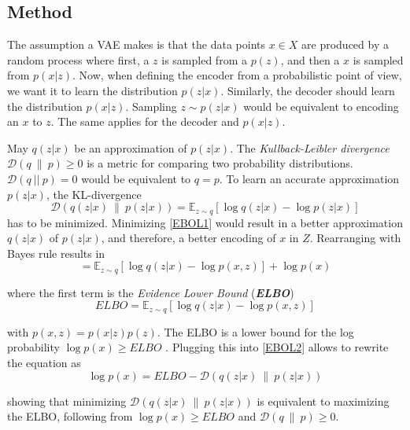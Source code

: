 \documentclass[a4paper]{IEEEtran}
\begin{document}
\subsection{Method}
The assumption a VAE makes is that the data points $x \in X$ are produced by a random process where first, a $z$ is sampled from a $p(z)$, and then a $x$ is sampled from $p(x|z)$. Now, when defining the encoder from a probabilistic point of view, we want it to learn the distribution $p(z|x)$. Similarly, the decoder should learn the distribution $p(x|z)$. Sampling $z \sim p(z|x)$ would be equivalent to encoding an $x$ to $z$. The same applies for the decoder and $p(x|z)$.

May $q(z|x)$ be an approximation of $p(z|x)$. The 
\textit{Kullback-Leibler divergence} $\mathcal{D}(q \ \| \ p) \geq 0$ is a metric for comparing two probability distributions. $\mathcal{D}(q \ || \ p) = 0$ would be equivalent to $q = p$. To learn an accurate approximation $p(z|x)$, the KL-divergence
\begin{equation}
	\mathcal{D}\left(q(z|x) \ \| \ p(z|x) \right) = \mathbb{E}_{z \sim q}\left[ \log q(z|x) - \log p(z|x) \right]
	\label{EBOL1}
\end{equation}
has to be minimized. Minimizing \eqref{EBOL1} would result in a better approximation $q(z|x)$ of $p(z|x)$, and therefore, a better encoding of $x$ in $Z$. Rearranging with Bayes rule results in
\begin{equation}
	= \mathbb{E}_{z \sim q} \left[ \log q(z|x) - \log p(x,z) \right] + \log p(x)
	\label{EBOL2}
\end{equation}

where the first term is the \textit{Evidence Lower Bound} (\textit{\textbf{ELBO}})
\begin{equation}
	ELBO = \mathbb{E}_{z \sim q} \left[ \log q(z|x) - \log p(x,z) \right]
	\label{ELBO3}
\end{equation} 

with $p(x,z) = p(x|z)p(z)$. The ELBO is a lower bound for the log probability $\log p(x) \geq ELBO$ \cite{kingma_2019}. Plugging this into \eqref{EBOL2} allows to rewrite the equation as
\begin{equation}
	\log p(x) = ELBO - \mathcal{D}\left(q(z|x) \ \| \ p(z|x) \right)
	\label{ELBO4}
\end{equation}

showing that minimizing $\mathcal{D}\left(q(z|x) \ \| \ p(z|x) \right)$ is equivalent to maximizing the ELBO, following from $\log p(x) \geq ELBO$ and $\mathcal{D}(q \ \| \ p) \geq 0$.
\end{document}
